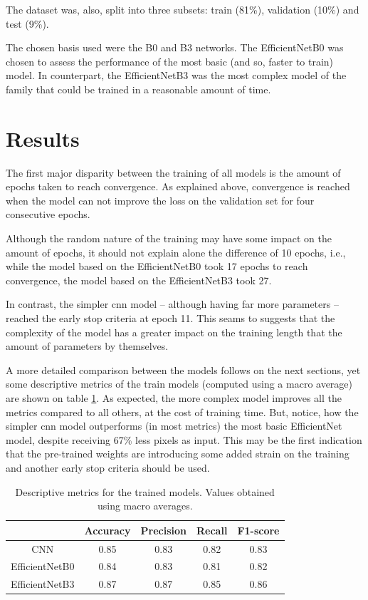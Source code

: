 \documentclass[conference]{IEEEtran}
\begin{document}
The dataset was, also, split into three subsets: train (81\%), validation (10\%) and test (9\%). 

The chosen basis used were the B0 and B3 networks. The EfficientNetB0 was chosen to assess the performance of the most basic (and so, faster to train) model. In counterpart, the EfficientNetB3 was the most complex model of the family that could be trained in a reasonable amount of time.

\section{Results}

The first major disparity between the training of all models is the amount of epochs taken to reach convergence. As explained above, convergence is reached when the model can not improve the loss on the validation set for four consecutive epochs.

Although the random nature of the training may have some impact on the amount of epochs, it should not explain alone the difference of 10 epochs, i.e., while the model based on the EfficientNetB0 took 17 epochs to reach convergence, the model based on the EfficientNetB3 took 27. 

In contrast, the simpler \gls{cnn} model -- although having far more parameters -- reached the early stop criteria at epoch 11. This seams to suggests that the complexity of the model has a greater impact on the training length that the amount of parameters by themselves.

A more detailed comparison between the models follows on the next sections, yet some descriptive metrics of the train models (computed using a macro average) are shown on table \ref{tab:train_results}. As expected, the more complex model improves all the metrics compared to all others, at the cost of training time. But, notice, how the simpler \gls{cnn} model outperforms (in most metrics) the most basic EfficientNet model, despite receiving 67\% less pixels as input. This may be the first indication that the pre-trained weights are introducing some added strain on the training and another early stop criteria should be used.

\begin{table}[htp]
\centering
\caption{Descriptive metrics for the trained models. Values obtained using macro averages.}
\label{tab:train_results}
\begin{tabular}{ccccc}
               & Accuracy & Precision & Recall & F1-score \\ \hline
CNN            & 0.85     & 0.83      & 0.82   & 0.83     \\
EfficientNetB0 & 0.84     & 0.83      & 0.81   & 0.82     \\
EfficientNetB3 & 0.87     & 0.87      & 0.85   & 0.86    
\end{tabular}
\end{table}
\end{document}
